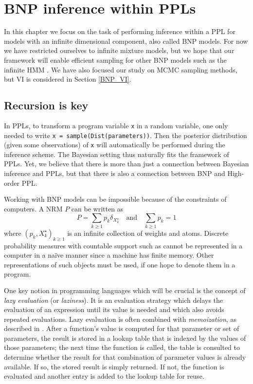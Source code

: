 
\chapter{\gls{BNP} inference within \glspl{PPL}} \label{BNP_PPL}
In this chapter we focus on the task of performing inference within a \gls{PPL} for models with an infinite dimensional component, also called \gls{BNP} models.
For now we have restricted ourselves to infinite mixture models, but we hope that our framework will enable efficient sampling for other \gls{BNP} models such as the infinite \acrlong{HMM} \cite{Beal02theinfinite}. We have also focused our study on \gls{MCMC} sampling methods, but \acrlong{VI} is considered in Section \ref{BNP_VI}.

\section{Recursion is key} \label{recursion}

In \glspl{PPL}, to transform a program variable \texttt{x} in a random variable, one only needed to write \texttt{x = sample(Dist(parameters))}. Then the posterior distribution (given some observations) of \texttt{x} will automatically be performed during the inference scheme.
The Bayesian setting thus naturally fits the framework of \glspl{PPL}.
Yet, we believe that there is more  than just a connection between Bayesian inference and \glspl{PPL}, but that there is also a connection between \acrlong{BNP} and High-order \gls{PPL}.

Working with \gls{BNP} models can be impossible because of the constraints of computers.
A \gls{NRM} $P$ can be written \cite{Kingman:1967kn} as
$$P = \sum_{k \ge 1}{{p}_k \delta_{X^\star_k}} \quad \text{and} \quad \sum_{k \ge 1}{p_k}=1$$
where $\left({p}_k, X^\star_k \right)_{k \ge 1}$ is an infinite collection of weights and atoms.
Discrete probability measures with countable support such as  cannot be represented in a computer in a naïve manner since a machine has finite memory.
Other representations of such objects must be used, if one hope to denote them in a program.

One key notion in programming languages which will be crucial is the concept of \textit{lazy evaluation} (or \textit{laziness}). It is an evaluation strategy which delays the evaluation of an expression until its value is needed and which also avoids repeated evaluations.
Lazy evaluation is often combined with \textit{memoization}, as described in \cite{Bentley:1982:WEP:539147}. After a function's value is computed for that parameter or set of parameters, the result is stored in a lookup table that is indexed by the values of those parameters; the next time the function is called, the table is consulted to determine whether the result for that combination of parameter values is already available. If so, the stored result is simply returned. If not, the function is evaluated and another entry is added to the lookup table for reuse.

